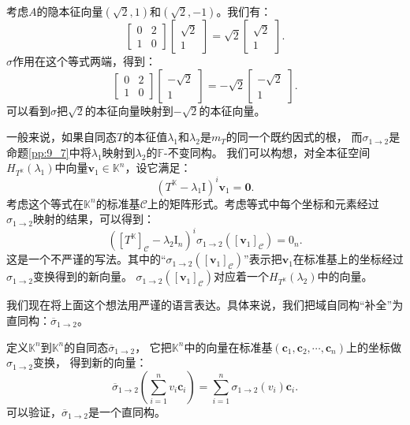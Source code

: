 \documentclass[12pt,UTF8,fontset=none]{ctexbook}
\begin{document}
考虑$A$的隐本征向量$(\sqrt{2}, 1)$和$(\sqrt{2}, -1)$。我们有：
$$ \begin{bmatrix} 0 & 2 \\ 1 & 0 \end{bmatrix} \begin{bmatrix} \sqrt{2} \\ 1 \end{bmatrix} = \sqrt{2} \begin{bmatrix} \sqrt{2} \\ 1 \end{bmatrix}.$$
$\sigma$作用在这个等式两端，得到：
$$ \begin{bmatrix} 0 & 2 \\ 1 & 0 \end{bmatrix} \begin{bmatrix} -\sqrt{2} \\ 1 \end{bmatrix} = -\sqrt{2} \begin{bmatrix} -\sqrt{2} \\ 1 \end{bmatrix}.$$
可以看到$\sigma$把$\sqrt{2}$的本征向量映射到$-\sqrt{2}$的本征向量。

一般来说，如果自同态$T$的本征值$\lambda_1$和$\lambda_2$是$m_T$的同一个既约因式的根，
而$\sigma_{1\rightarrow 2}$是命题\ref{pp:9_7}中将$\lambda_1$映射到$\lambda_2$的$\mathbb{F}$-不变同构。
我们可以构想，对全本征空间$H_{T^{\mathbb{K}}}(\lambda_1)$中向量$\mathbf{v}_1 \in \mathbb{K}^n$，设它满足：
$$ (T^{\mathbb{K}} - \lambda_1\mathrm{I})^i \mathbf{v}_1 = \mathbf{0}. $$
考虑这个等式在$\mathbb{K}^n$的标准基$\mathcal{C}$上的矩阵形式。考虑等式中每个坐标和元素经过$\sigma_{1\rightarrow 2}$映射的结果，可以得到：
$$ ([T^{\mathbb{K}}]_\mathcal{C} - \lambda_2\mathrm{I}_n)^i \sigma_{1\rightarrow 2}([\mathbf{v}_1]_\mathcal{C}) = \mathrm{0}_n. $$
这是一个不严谨的写法。其中的“$\sigma_{1\rightarrow 2}([\mathbf{v}_1]_\mathcal{C})$”表示把$\mathbf{v}_1$在标准基上的坐标经过$\sigma_{1\rightarrow 2}$变换得到的新向量。
$\sigma_{1\rightarrow 2}([\mathbf{v}_1]_\mathcal{C})$对应着一个$H_{T^{\mathbb{K}}}(\lambda_2)$中的向量。

我们现在将上面这个想法用严谨的语言表达。具体来说，我们把域自同构“补全”为直同构：$\overline{\sigma}_{1\rightarrow 2}$。

定义$\mathbb{K}^n$到$\mathbb{K}^n$的自同态$\overline{\sigma}_{1\rightarrow 2}$，
它把$\mathbb{K}^n$中的向量在标准基$(\mathbf{c}_1, \mathbf{c}_2, \cdots , \mathbf{c}_n)$上的坐标做$\sigma_{1\rightarrow 2}$变换，
得到新的向量：
$$ \overline{\sigma}_{1\rightarrow 2} \left(\sum_{i=1}^n v_i \mathbf{c}_i\right) = \sum_{i=1}^n \sigma_{1\rightarrow 2} \left( v_i\right) \mathbf{c}_i.$$
可以验证，$\overline{\sigma}_{1\rightarrow 2}$是一个直同构。
\end{document}
